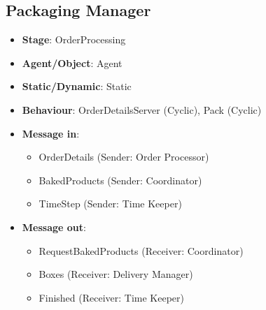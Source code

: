 \documentclass[12pt]{article}
\begin{document}
\subsection{Packaging Manager}%
\label{sub:packaging_manager}
\begin{itemize}
    \item \textbf{Stage}: OrderProcessing
    \item \textbf{Agent/Object}: Agent
    \item \textbf{Static/Dynamic}: Static
    \item \textbf{Behaviour}: OrderDetailsServer (Cyclic), Pack (Cyclic)
    \item \textbf{Message in}:
        \begin{itemize}
            \item OrderDetails (Sender: Order Processor)
            \item BakedProducts (Sender: Coordinator)
            \item TimeStep (Sender: Time Keeper)
        \end{itemize}
    \item \textbf{Message out}:
        \begin{itemize}
            \item RequestBakedProducts (Receiver: Coordinator)
            \item Boxes (Receiver: Delivery Manager)
            \item Finished (Receiver: Time Keeper)
        \end{itemize}
\end{itemize}

\newpage{}
\end{document}

